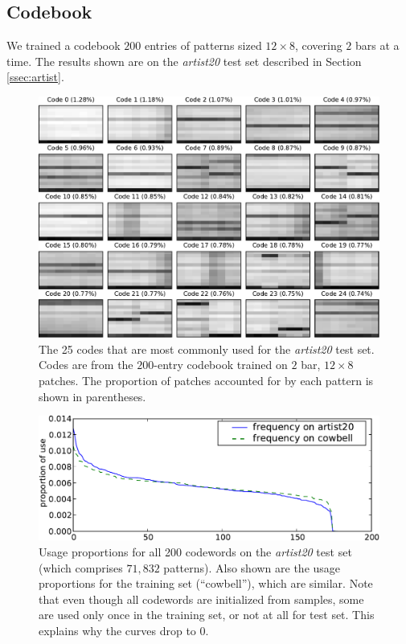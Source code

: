 \documentclass{article}
\begin{document}
\subsection{Codebook}\label{sec:codebook}

We trained a codebook $200$ entries of patterns sized $12\times8$, covering
$2$ bars at a time.  The results shown are on the {\it artist20} test set described in 
Section \ref{ssec:artist}.


\begin{figure}[t]
\begin{center}
\includegraphics[width=\columnwidth]{codes1}
\end{center}
\caption{\small{
The 25 codes that are 
most commonly used for the {\it artist20} test set. 
Codes are from the $200$-entry codebook trained on $2$ bar, $12 \times 8$
patches.  The proportion of patches accounted for by each pattern is shown 
in parentheses.
}}
\label{fig:codes1}
\end{figure}

\begin{figure}[bt]
\begin{center}
\includegraphics[width=.99\columnwidth]{freqs}
\end{center}
\caption{\small{Usage proportions for all 200 codewords 
on the {\it artist20} test set (which comprises $71,832$
patterns).  Also shown are the usage proportions for the training set (``cowbell''), 
which are similar.
Note that even though all codewords are initialized from samples, some
are used only once in the training set, or not at all for test set.
This explains why the curves drop to $0$.
}}
\label{fig:freqs}
\end{figure}
\end{document}
